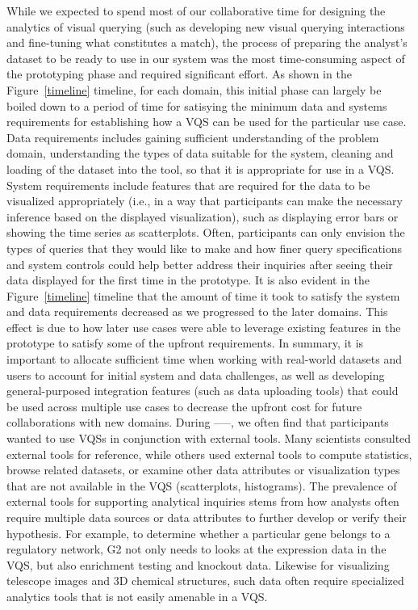  \par While we expected to spend most of our collaborative time for designing the analytics of visual querying (such as developing new visual querying interactions and fine-tuning what constitutes a match), the process of preparing the analyst's dataset to be ready to use in our system was the most time-consuming aspect of the prototyping phase and required significant effort. As shown in the Figure~\ref{timeline} timeline, for each domain, this initial phase can largely be boiled down to a period of time for satisying the minimum data and systems requirements for establishing how a VQS can be used for the particular use case. Data requirements includes gaining sufficient understanding of the problem domain, understanding the types of data suitable for the system, cleaning and loading of the dataset into the tool, so that it is appropriate for use in a VQS. System requirements include features that are required for the data to be visualized appropriately (i.e., in a way that participants can make the necessary inference based on the displayed visualization), such as displaying error bars or showing the time series as scatterplots. Often, participants can only envision the types of queries that they would like to make and how finer query specifications and system controls could help better address their inquiries after seeing their data displayed for the first time in the prototype. It is also evident in the Figure~\ref{timeline} timeline that the amount of time it took to satisfy the system and data requirements decreased as we progressed to the later domains. This effect is due to how later use cases were able to leverage existing features in the prototype to satisfy some of the upfront requirements. In summary, it is important to allocate sufficient time when working with real-world datasets and users to account for initial system and data challenges, as well as developing general-purposed integration features (such as data uploading tools) that could be used across multiple use cases to decrease the upfront cost for future collaborations with new domains.
 \npar {}
 During -----, we often find that participants wanted to use VQSs in conjunction with external tools. Many scientists consulted external tools for reference, while others used external tools to compute statistics, browse related datasets, or examine other data attributes or visualization types that are not available in the VQS (scatterplots, histograms). The prevalence of external tools for supporting analytical inquiries stems from how analysts often require multiple data sources or data attributes to further develop or verify their hypothesis. For example, to determine whether a particular gene belongs to a regulatory network, G2 not only needs to looks at the expression data in the VQS, but also enrichment testing and knockout data. Likewise for visualizing telescope images and 3D chemical structures, such data often require specialized analytics tools that is not easily amenable in a VQS.
